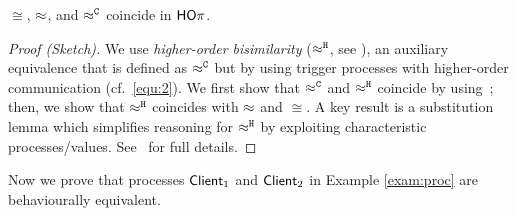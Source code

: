 \documentclass[a4paper,UKenglish]{lipics}
\theoremstyle{definition}
\begin{document}

\begin{theorem}[Coincidence]\rm
	\label{the:coincidence}
$\cong$, $\approx$,  and $\approx^\mathtt{C}$ coincide in $\mathsf{HO}\pi$. 
\end{theorem}
\begin{proof}[Proof (Sketch)]
We use 
\emph{higher-order bisimilarity} ($\approx^\mathtt{H}$, see ), 
an auxiliary equivalence that
is defined as $\approx^\mathtt{C}$ but by
using  trigger processes with higher-order communication (cf.~\eqref{equ:2}).
We first show that $\approx^\mathtt{C}$ and $\approx^\mathtt{H}$ coincide by using~; 
then, we show that $\approx^\mathtt{H}$ coincides with $\approx$ and $\cong$. 
A key result is a  substitution lemma which simplifies reasoning 
for $\approx^\mathtt{H}$
by exploiting characteristic processes/values.
See~\cite{KouzapasPY15} for full details.
\end{proof}
Now we prove 
that  processes 
$\mathsf{Client}_1$ and $\mathsf{Client}_2$ 
in Example \ref{exam:proc}
are behaviourally equivalent.
\end{document}
